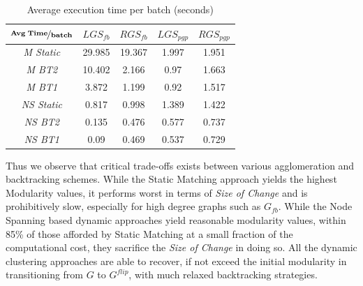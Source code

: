 \documentclass[conference]{IEEEtran}
\begin{document}
\begin{table}
\begin{center}
\begin{tabular}{|c|c|c|c|c|}\hline
$\mathbf{\nicefrac{\mathbf{Avg\; Time}}{batch}}$ & \textit{$LGS_{fb}$} & 
\textit{$RGS_{fb}$} & \textit{$LGS_{pgp}$} & \textit{$RGS_{pgp}$}\\\hline
\textit{M Static} & 29.985 & 19.367 & 1.997 & 1.951\\\hline
\textit{M BT2} & 10.402 & 2.166 & 0.97 & 1.663\\\hline
\textit{M BT1} & 3.872 & 1.199 & 0.92 & 1.517\\\hline
\textit{NS Static} & 0.817 & 0.998 & 1.389 & 1.422\\\hline
\textit{NS BT2} & 0.135 & 0.476 & 0.577 & 0.737\\\hline
\textit{NS BT1} & 0.09 & 0.469 & 0.537 & 0.729\\\hline
\end{tabular}
\vspace{-0.4cm}
\caption{\label{ett}Average execution time per 
batch (seconds)\vspace{-0.5cm}}
\end{center}
\end{table}
Thus we observe that critical trade-offs exists between various agglomeration 
and backtracking schemes. While the Static Matching approach yields the highest 
Modularity values, it performs worst in terms of \emph{Size of Change} and is 
prohibitively slow, especially for high degree graphs such as $G_{fb}$. While 
the Node Spanning based dynamic approaches yield reasonable modularity values, 
within 85\% of those afforded by Static Matching at a small fraction of the 
computational cost, they sacrifice the \emph{Size of Change} in doing so. All 
the dynamic clustering approaches are able to recover, if not exceed the 
initial modularity in transitioning from $G$ to $G^{flip}$, with much relaxed 
backtracking strategies.
\end{document}
